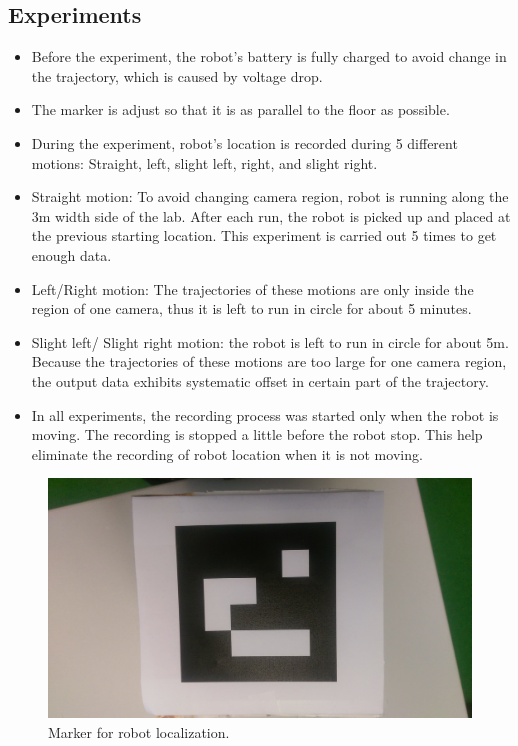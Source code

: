 \documentclass[paper=a4, fontsize=11pt]{scrartcl} %
\begin{document}
    \subsection{Experiments}
    \begin{itemize}
   		\item Before the experiment, the robot's battery is fully charged to avoid change in the trajectory, which is caused by voltage drop.
   		\item The marker is adjust so that it is as parallel to the floor as possible.
	    \item During the experiment, robot's location is recorded during 5 different motions: Straight, left, slight left, right, and slight right.
	    \item Straight motion: To avoid changing camera region, robot is running along the 3m width side of the lab. After each run, the robot is picked up and placed at the previous starting location. This experiment is carried out 5 times to get enough data.
	    \item Left/Right motion: The trajectories of these motions are only inside the region of one camera, thus it is left to run in circle for about 5 minutes.
	    \item Slight left/ Slight right motion: the robot is left to run in circle for about 5m. Because the trajectories of these motions are too large for one camera region, the output data exhibits systematic offset in certain part of the trajectory.
	    \item In all experiments, the recording process was started only when the robot is moving. The recording is stopped a little before the robot stop. This help eliminate the recording of robot location when it is not moving.  
    \end{itemize}
    \begin{figure}[h!]
        \begin{center}
            \setlength{\fboxsep}{0.5pt} %
            \setlength{\fboxrule}{0.5pt}
            \includegraphics[width=12cm,fbox]{images/marker.jpg}
            \caption{Marker for robot localization.}
        \end{center}
    \end{figure}
    
\end{document}
